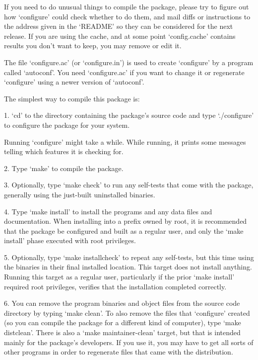 \begin{DoxyCodeInclude}
   If you need to do unusual things to compile the package, please try
to figure out how `configure' could check whether to do them, and mail
diffs or instructions to the address given in the `README' so they can
be considered for the next release.  If you are using the cache, and at
some point `config.cache' contains results you don't want to keep, you
may remove or edit it.

   The file `configure.ac' (or `configure.in') is used to create
`configure' by a program called `autoconf'.  You need `configure.ac' if
you want to change it or regenerate `configure' using a newer version
of `autoconf'.

   The simplest way to compile this package is:

  1. `cd' to the directory containing the package's source code and type
     `./configure' to configure the package for your system.

     Running `configure' might take a while.  While running, it prints
     some messages telling which features it is checking for.

  2. Type `make' to compile the package.

  3. Optionally, type `make check' to run any self-tests that come with
     the package, generally using the just-built uninstalled binaries.

  4. Type `make install' to install the programs and any data files and
     documentation.  When installing into a prefix owned by root, it is
     recommended that the package be configured and built as a regular
     user, and only the `make install' phase executed with root
     privileges.

  5. Optionally, type `make installcheck' to repeat any self-tests, but
     this time using the binaries in their final installed location.
     This target does not install anything.  Running this target as a
     regular user, particularly if the prior `make install' required
     root privileges, verifies that the installation completed
     correctly.

  6. You can remove the program binaries and object files from the
     source code directory by typing `make clean'.  To also remove the
     files that `configure' created (so you can compile the package for
     a different kind of computer), type `make distclean'.  There is
     also a `make maintainer-clean' target, but that is intended mainly
     for the package's developers.  If you use it, you may have to get
     all sorts of other programs in order to regenerate files that came
     with the distribution.


\end{DoxyCodeInclude}
